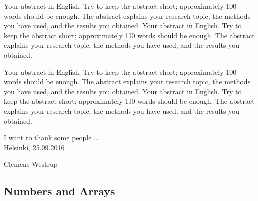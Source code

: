 \makecoverpage

\begin{abstractpage}[english]
  Your abstract in English. Try to keep the abstract short; approximately
  100 words should be enough. The abstract explains your research topic,
  the methods you have used, and the results you obtained.
  Your abstract in English. Try to keep the abstract short; approximately
  100 words should be enough. The abstract explains your research topic,
  the methods you have used, and the results you obtained.

  Your abstract in English. Try to keep the abstract short; approximately
  100 words should be enough. The abstract explains your research topic,
  the methods you have used, and the results you obtained.
  Your abstract in English. Try to keep the abstract short; approximately
  100 words should be enough. The abstract explains your research topic,
  the methods you have used, and the results you obtained.
\end{abstractpage}

\newpage


I want to thank some people \ldots
\\

\vspace{5cm}
Helsinki, 25.09.2016

\vspace{5mm}
{\hfill Clemens Westrup \hspace{1cm}}

\newpage

\thesistableofcontents
\clearpage


\subsection*{Numbers and Arrays}

